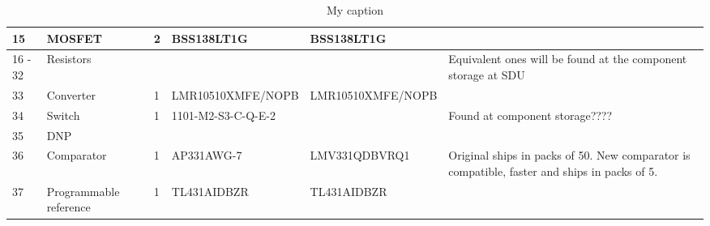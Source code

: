 \begin{sidewaystable}
\centering
\caption{My caption}
\label{my-label}
\begin{tabular}{|p{0.5cm}|p{2cm}|p{1.5cm}|l|l|p{5cm}|}
\hline

15      & MOSFET                 & 2        & BSS138LT1G            & BSS138LT1G            &                                                                                                                                                                                                              \\ \hline
16 - 32 & Resistors              &          &                       &                       & Equivalent ones will be found at the component storage at SDU                                                                                                                                                \\ \hline
33      & Converter              & 1        & LMR10510XMFE/NOPB     & LMR10510XMFE/NOPB     &                                                                                                                                                                                                              \\ \hline
34      & Switch                 & 1        & 1101-M2-S3-C-Q-E-2    &                       & Found at component storage????                                                                                                                                                                               \\ \hline
35      & DNP                    &          &                       &                       &                                                                                                                                                                                                              \\ \hline
36      & Comparator             & 1        & AP331AWG-7            & LMV331QDBVRQ1         & Original ships in packs of 50. New comparator is compatible, faster and ships in packs of 5.                                                                                                                 \\ \hline
37      & Programmable reference & 1        & TL431AIDBZR           & TL431AIDBZR           &                                                                                                                                                                                                              \\ \hline
\end{tabular}

	
\end{sidewaystable}
